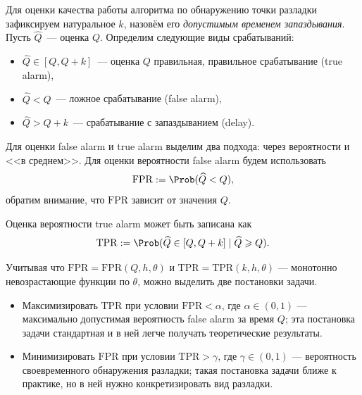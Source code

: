 \documentclass{math-mech-sci}
\newcommand{\FPR}{\mathrm{FPR}}
\newcommand{\TPR}{\mathrm{TPR}}
\newcommand{\FARL}{\mathrm{FARL}}
\newcommand{\TARL}{\mathrm{TARL}}
\renewcommand{\geq}{\geqslant}
\begin{document}
Для оценки качества работы алгоритма по обнаружению точки разладки зафиксируем натуральное $k$, назовём его \textit{допустимым временем запаздывания}. Пусть $\widehat Q$~--- оценка $Q$. Определим следующие виды срабатываний:
\begin{itemize}
	\item $\widehat Q\in [Q,Q+k]$~--- оценка $Q$ правильная, правильное срабатывание (true alarm),
	\item $\widehat Q<Q$~--- ложное срабатывание (false alarm),
	\item $\widehat Q>Q+k$~--- срабатывание с запаздыванием (delay).
\end{itemize}

Для оценки false alarm и true alarm выделим два подхода: через вероятности и <<в среднем>>. Для оценки вероятности false alarm будем использовать
	\begin{equation*}
	\FPR:=\Prob(\widehat Q<Q),
	\end{equation*}
	обратим внимание, что $\FPR$ зависит от значения $Q$.

Оценка вероятности true alarm может быть записана как
	\begin{equation*}
		\TPR:=\Prob(\widehat Q\in[Q,Q+k]\mid \widehat Q\geq Q).
	\end{equation*}
	

Учитывая что $\FPR = \FPR(Q,h,\theta)$ и $\TPR= \TPR(k,h,\theta)$ --- монотонно невозрастающие функции по $\theta$, можно выделить две постановки задачи.
\begin{itemize}
	\item Максимизировать $\TPR$ при условии $\FPR<\alpha$, где $\alpha\in(0,1)$ --- максимально допустимая вероятность false alarm за время $Q$; эта постановка задачи стандартная и в ней легче получать теоретические результаты.
	\item Минимизировать $\FPR$ при условии $\TPR>\gamma$, где $\gamma\in(0,1)$ --- вероятность своевременного обнаружения разладки; такая постановка задачи ближе к практике, но в ней нужно конкретизировать вид разладки.
\end{itemize}
\end{document}
